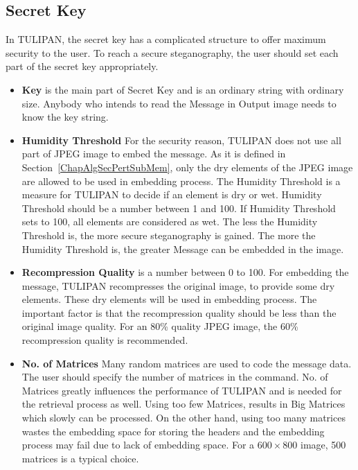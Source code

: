 \subsection{Secret Key}

In TULIPAN, the secret key has a complicated structure to offer maximum security to the user. To reach a secure steganography, the user should set each part of the secret key appropriately.

\begin{itemize}
  \item{\bf Key} is the main part of Secret Key and is an ordinary string with ordinary size. Anybody who intends to read the Message in Output image needs to know the key string.

  \item{\bf Humidity Threshold} For the security reason, TULIPAN does not use all part of JPEG image to embed the message. As it is defined in Section~\ref{ChapAlgSecPertSubMem}, only the dry elements of the JPEG image are allowed to be used in embedding process. The Humidity Threshold is a measure for TULIPAN to decide if an element is dry or wet. Humidity Threshold should be a number between 1 and 100. If Humidity Threshold sets to 100, all elements are considered as wet. The less the Humidity Threshold is, the more secure steganography is gained. The more the Humidity Threshold is, the greater Message can be embedded in the image.

  \item{\bf Recompression Quality} is a number between 0 to 100. For embedding the message, TULIPAN recompresses the original image, to provide some dry elements. These dry elements will be used in embedding process. The important factor is that the recompression quality should be less than the original image quality. For an 80\% quality JPEG image, the 60\% recompression quality is recommended.

  \item{\bf No. of Matrices} Many random matrices are used to code the message data. The user should specify the number of matrices in the command. No. of Matrices greatly influences the performance of TULIPAN and is needed for the retrieval process as well. Using too few Matrices, results in Big Matrices which slowly can be processed. On the other hand, using too many matrices wastes the embedding space for storing the headers and the embedding process may fail due to lack of embedding space. For a $600\times 800$ image, 500 matrices is a typical choice.

\end{itemize}

